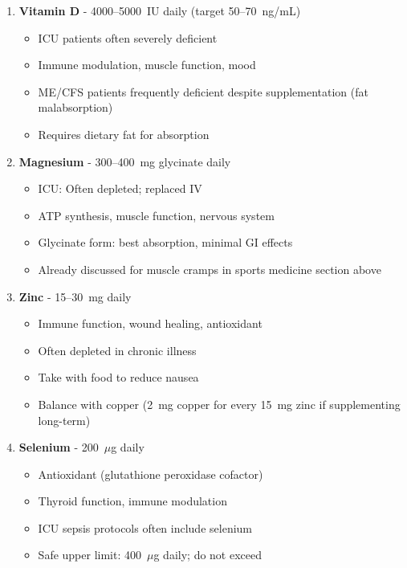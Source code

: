 \begin{tcolorbox}[colback=blue!5!white,colframe=blue!75!black,title=ICU-Derived Micronutrient Protocol for ME/CFS]
\begin{enumerate}
    \item \textbf{Vitamin D} - 4000--5000~IU daily (target 50--70~ng/mL)
    \begin{itemize}
        \item ICU patients often severely deficient
        \item Immune modulation, muscle function, mood
        \item ME/CFS patients frequently deficient despite supplementation (fat malabsorption)
        \item Requires dietary fat for absorption
    \end{itemize}

    \item \textbf{Magnesium} - 300--400~mg glycinate daily
    \begin{itemize}
        \item ICU: Often depleted; replaced IV
        \item ATP synthesis, muscle function, nervous system
        \item Glycinate form: best absorption, minimal GI effects
        \item Already discussed for muscle cramps in sports medicine section above
    \end{itemize}

    \item \textbf{Zinc} - 15--30~mg daily
    \begin{itemize}
        \item Immune function, wound healing, antioxidant
        \item Often depleted in chronic illness
        \item Take with food to reduce nausea
        \item Balance with copper (2~mg copper for every 15~mg zinc if supplementing long-term)
    \end{itemize}

    \item \textbf{Selenium} - 200~$\mu$g daily
    \begin{itemize}
        \item Antioxidant (glutathione peroxidase cofactor)
        \item Thyroid function, immune modulation
        \item ICU sepsis protocols often include selenium
        \item Safe upper limit: 400~$\mu$g daily; do not exceed
    \end{itemize}
\end{enumerate}


\end{tcolorbox}
